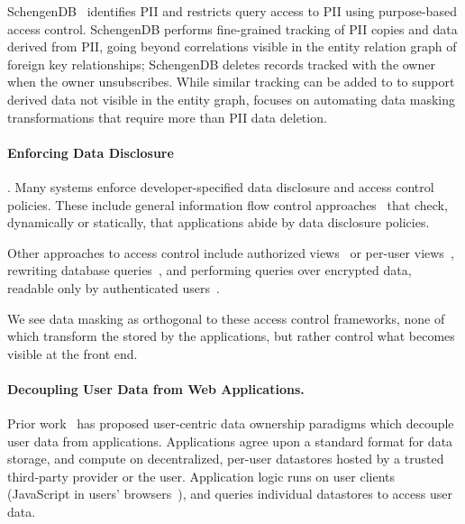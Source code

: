 SchengenDB~\cite{schengendb} identifies PII and restricts query access to PII using purpose-based
access control. SchengenDB performs fine-grained tracking of PII copies and data derived
from PII, going beyond correlations visible in the entity relation graph of foreign key
relationships; SchengenDB deletes records tracked with the owner when the owner unsubscribes.
While similar tracking can be added to \sys to support derived data not visible in the entity graph,
\sys focuses on automating data masking transformations that require more than PII data deletion. 


\paragraph{Enforcing Data Disclosure}.
Many systems enforce developer-specified data disclosure and access control policies. These include
general information flow control approaches~\cite{static, jeeves, jif, hail} that check, dynamically
or statically, that applications abide by data disclosure policies.

Other approaches to access control include authorized views~\cite{oracle} or per-user
views~\cite{multiverse}, rewriting database queries~\cite{rewriting, qapla, sieve}, and performing
queries over encrypted data, readable only by authenticated users~\cite{cryptdb}.

We see data masking as orthogonal to these access control frameworks, none of which transform the
 stored by the applications, but rather control what becomes visible at the front
end. 



\paragraph{Decoupling User Data from Web Applications.} 
Prior work~\cite{diy, solid, amber, oort, w5, blockstack, bstore, databox} has proposed user-centric data
ownership paradigms which decouple user data from applications. Applications agree upon a standard
format for data storage, and compute on decentralized, per-user datastores hosted by a trusted
third-party provider or the user. Application logic runs on user clients (\eg JavaScript in users'
browsers~\cite{solid, blockstack, bstore}), and queries individual datastores to access user data.

